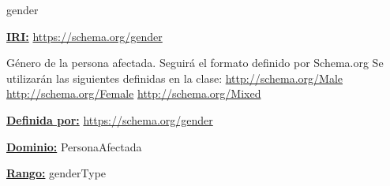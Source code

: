 





\begin{mybox}{gender}
\begin{flushleft}
\underline{\textbf{IRI:}}
\url{https://schema.org/gender}
\newline

Género de la persona afectada.
\newline Seguirá el formato definido por Schema.org \cite{schema_gender}
Se utilizarán las siguientes definidas en la clase:
\newline \url{http://schema.org/Male}
\newline \url{http://schema.org/Female}
\newline \url{http://schema.org/Mixed}
\newline

\underline{\textbf{Definida por:}}
\url{https://schema.org/gender}
\newline

\underline{\textbf{Dominio:}}
\newline PersonaAfectada
\newline

\underline{\textbf{Rango:}}
\newline genderType \cite{schema_gender_explicacion_rango}

\end{flushleft}
\end{mybox}






